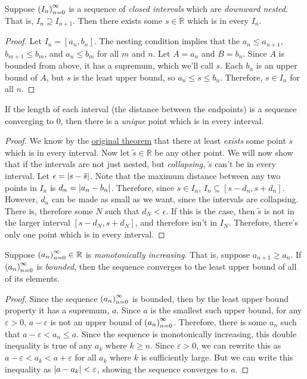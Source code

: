 \begin{theorem}
Suppose $\seq{I}$ is a sequence of \emph{closed intervals} which are \emph{downward nested}. That is, $I_n \supseteq I_{n+1}$. Then there exists some $s \in \mathbb{R}$ which is in every $I_n$.
\end{theorem}
\begin{proof}
Let $I_n = [a_n,b_n]$. The nesting condition implies that the $a_n \leq a_{n+1}$, $b_{m+1} \leq b_m$, and $a_n \leq b_m$ for all $m$ and $n$. Let $A = {a_n}$ and $B = {b_n}$. Since $A$ is bounded from above, it has a supremum, which we'll call $s$. Each $b_n$ is an upper bound of $A$, but $s$ is the least upper bound, so $a_n \leq s \leq b_n$. Therefore, $s \in I_n$ for all $n$.
\end{proof}
\begin{corollary}
If the length of each interval (the distance between the endpoints) is a sequence converging to $0$, then there is a \emph{unique} point which is in every interval.
\end{corollary}
\begin{proof}
We know by the \hyperlink{Nested Intervals Theorem}{original theorem} that there at least \emph{exists} some point $s$  which is in every interval. Now let $\tilde{s} \in \mathbb{R}$ be any other point. We will now show that if the intervals are not just nested, but \emph{collapsing}, $\tilde{s}$ can't be in every interval. Let $\epsilon = \left\lvert s-\tilde{s} \right\rvert$. Note that the maximum distance between any two points in $I_n$ is $d_n = \left\lvert a_n-b_n \right\rvert$. Therefore, since $s \in I_n$, $I_n \subseteq [s-d_n,s+d_n]$. However, $d_n$ can be made as small as we want, since the intervals are collapsing. There is, therefore some $N$ such that $d_N < \epsilon$. If this is the case, then $\tilde{s}$ is not in the larger interval $[s-d_N,s+d_N]$, and therefore isn't in $I_N$. Therefore, there's only one point which is in every interval.
\end{proof}
\begin{theorem}
Suppose $\seq{a} \in \mathbb{R}$ is \emph{monotonically increasing}. That is, suppose $a_{n+1} \geq a_n$. If $\seq{a}$ is \emph{bounded}, then the sequence converges to the least upper bound of all of its elements.
\end{theorem}
\begin{proof}
Since the sequence $\seq{a}$ is bounded, then by the least upper bound property it has a supremum, $a$. Since $a$ is the smallest such upper bound, for any $\varepsilon > 0$, $a-\varepsilon$ is not an upper bound of $\seq{a}$. Therefore, there is some $a_n$ such that $a-\varepsilon < a_n \leq a$. Since the sequence is monotonically increasing, this double inequality is true of any $a_k$ where $k \geq n$. Since $\varepsilon > 0$, we can rewrite this as $a-\varepsilon < a_k < a+\varepsilon$ for all $a_k$ where $k$ is sufficiently large. But we can write this inequality as $\left\lvert a-a_k \right\rvert < \varepsilon$, showing the sequence converges to $a$.
\end{proof}
